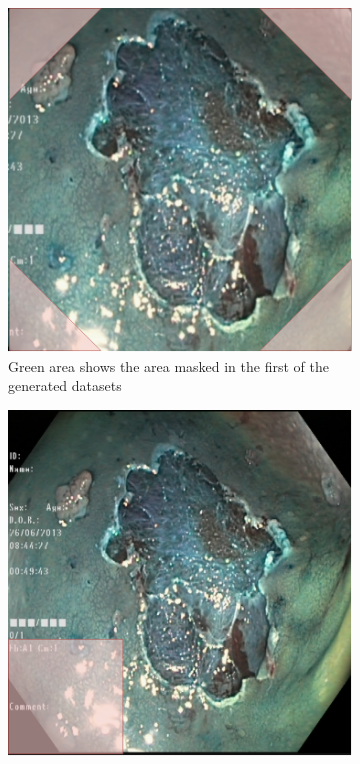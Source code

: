 \begin{figure}
     \centering
     \begin{subfigure}[b]{0.3\textwidth}
         \centering
         \includegraphics[width=\textwidth]{methodology/figures/cornermask.png}
         \caption{Green area shows the area masked in the first of the generated datasets}
         \label{fig:CornerMask}
     \end{subfigure}
     \hfill
     \begin{subfigure}[b]{0.3\textwidth}
         \centering
         \includegraphics[width=\textwidth]{methodology/figures/greenmask.png}

\end{subfigure}
\end{figure}
